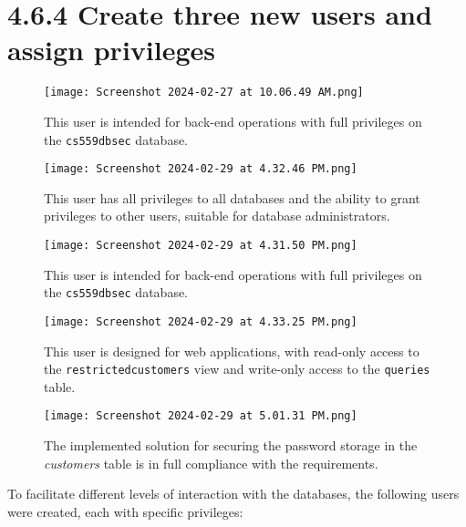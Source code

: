 \documentclass{article}
\begin{document}
\section*{4.6.4 Create three new users and assign privileges}

\begin{figure}[H]
    \centering
    \texttt{[image: Screenshot 2024-02-27 at 10.06.49 AM.png]}
    \caption{This user is intended for back-end operations with full privileges on the \texttt{cs559dbsec} database.}
\end{figure}

\begin{figure}[H]
    \centering
    \texttt{[image: Screenshot 2024-02-29 at 4.32.46 PM.png]}
    \caption{This user has all privileges to all databases and the ability to grant privileges to other users, suitable for database administrators.}
\end{figure}

\begin{figure}[H]
    \centering
    \texttt{[image: Screenshot 2024-02-29 at 4.31.50 PM.png]}
    \caption{This user is intended for back-end operations with full privileges on the \texttt{cs559dbsec} database.}
\end{figure}

\begin{figure}[H]
    \centering
    \texttt{[image: Screenshot 2024-02-29 at 4.33.25 PM.png]}
    \caption{This user is designed for web applications, with read-only access to the \texttt{restrictedcustomers} view and write-only access to the \texttt{queries} table.}
\end{figure}

\begin{figure}[H]
    \centering
    \texttt{[image: Screenshot 2024-02-29 at 5.01.31 PM.png]}
    \caption{The implemented solution for securing the password storage in the \textit{customers} table is in full compliance with the requirements.}
\end{figure}



To facilitate different levels of interaction with the databases, the following users were created, each with specific privileges:
\end{document}
